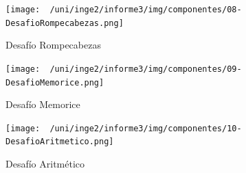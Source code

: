 \begin{figure}[H]
	\centering
	\texttt{[image: ~/uni/inge2/informe3/img/componentes/08-DesafioRompecabezas.png]}
	\caption{Desafío Rompecabezas}
        \vspace{5pt}
	\label{fig:Desafío Rompecabezas}
\end{figure}

\begin{figure}[H]
	\centering
	\texttt{[image: ~/uni/inge2/informe3/img/componentes/09-DesafioMemorice.png]}
	\caption{Desafío Memorice}
        \vspace{5pt}
	\label{fig:Desafío Memorice}
\end{figure}

\begin{figure}[H]
	\centering
	\texttt{[image: ~/uni/inge2/informe3/img/componentes/10-DesafioAritmetico.png]}
	\caption{Desafío Aritmético}
        \vspace{5pt}
	\label{fig:Desafío Aritmético}
\end{figure}

